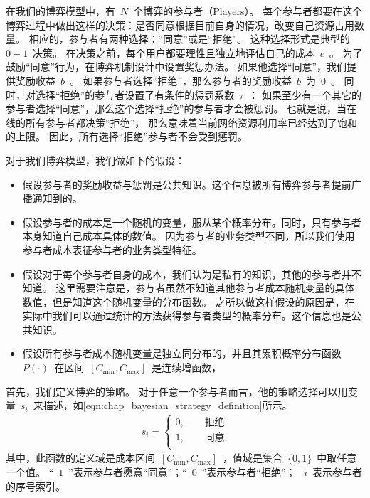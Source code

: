 在我们的博弈模型中，有~$N$~个博弈的参与者（Players）。
每个参与者都要在这个博弈过程中做出这样的决策：是否同意根据目前自身的情况，改变自己资源占用数量。
相应的，参与者有两种选择：“同意”或是“拒绝”。
这种选择形式是典型的~$0-1$~决策。
在决策之前，每个用户都要理性且独立地评估自己的成本~$c$~。
为了鼓励“同意”行为，在博弈机制设计中设置奖惩办法。
如果他选择“同意”，我们提供奖励收益~$b$~。
如果参与者选择“拒绝”，那么参与者的奖励收益~$b$~为~$0$~。
同时，对选择“拒绝”的参与者设置了有条件的惩罚系数~$\tau$~：
如果至少有一个其它的参与者选择“同意”，那么这个选择“拒绝”的参与者才会被惩罚。
也就是说，当在线的所有参与者都决策“拒绝”，
那么意味着当前网络资源利用率已经达到了饱和的上限。
因此，所有选择“拒绝”参与者不会受到惩罚。

对于我们博弈模型，我们做如下的假设：
\begin{itemize}
    \item 假设参与者的奖励收益与惩罚是公共知识。这个信息被所有博弈参与者提前广播通知到的。
    \item 假设参与者的成本是一个随机的变量，服从某个概率分布。同时，只有参与者本身知道自己成本具体的数值。
    因为参与者的业务类型不同，所以我们使用参与者成本表征参与者的业务类型特征。
    \item 假设对于每个参与者自身的成本，我们认为是私有的知识，其他的参与者并不知道。
    这里需要注意是，参与者虽然不知道其他参与者成本随机变量的具体数值，但是知道这个随机变量的分布函数。
    之所以做这样假设的原因是，在实际中我们可以通过统计的方法获得参与者类型的概率分布。这个信息也是公共知识。
    \item 假设所有参与者成本随机变量是独立同分布的，并且其累积概率分布函数~$P(\cdot)$~在区间~$[C_{\min}, C_{\max}]$~是连续增函数，
\end{itemize}

首先，我们定义博弈的策略。
对于任意一个参与者而言，他的策略选择可以用变量~$s_i$~来描述，如\eqref{eqn:chap_bayesian_strategy_definition}所示。
\begin{align}
    s_i = \begin{cases}
        0, \qquad\text{拒绝}\\
        1, \qquad\text{同意}\\
    \end{cases}
    \label{eqn:chap_bayesian_strategy_definition}
\end{align}
其中，此函数的定义域是成本区间~$[C_{\min}, C_{\max}]$~，值域是集合~$\{0,1\}$~中取任意一个值。
“~$1$~”表示参与者愿意“同意”；“~$0$~”表示参与者“拒绝”；
~$i$~表示参与者的序号索引。

